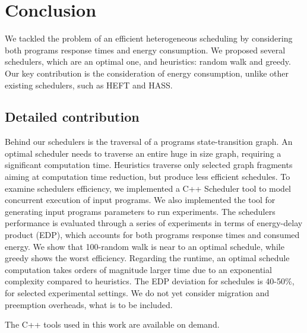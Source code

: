 \chapter{Conclusion}
\label{chap:conclusion}

We tackled the problem of an efficient heterogeneous scheduling by considering both programs response times and energy consumption. We proposed several schedulers, which are an optimal one, and heuristics: random walk and greedy. Our key contribution is the consideration of energy consumption, unlike other existing schedulers, such as HEFT and HASS.

\section{Detailed contribution}

Behind our schedulers is the traversal of a programs state-transition graph. An optimal scheduler needs to traverse an entire huge in size graph, requiring a significant computation time. Heuristics traverse only selected graph fragments aiming at computation time reduction, but produce less efficient schedules. To examine schedulers efficiency, we implemented a C++ Scheduler tool to model concurrent execution of input programs. We also implemented the tool for generating input programs parameters to run experiments. The schedulers performance is evaluated through a series of experiments in terms of energy-delay product (EDP), which accounts for both programs response times and consumed energy. We show that 100-random walk is near to an optimal schedule, while greedy shows the worst efficiency. Regarding the runtime, an optimal schedule computation takes orders of magnitude larger time due to an exponential complexity compared to heuristics. The EDP deviation for schedules is 40-50\%, for selected experimental settings. We do not yet consider migration and preemption overheads, what is to be included.

The C++ tools used in this work are available on demand.